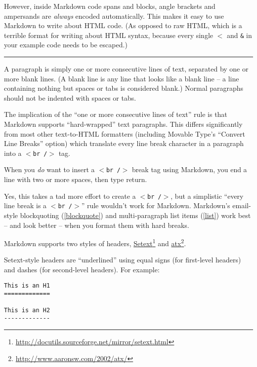 However, inside Markdown code spans and blocks, angle brackets and
ampersands are \emph{always} encoded automatically. This makes it easy to use
Markdown to write about HTML code. (As opposed to raw HTML, which is a
terrible format for writing about HTML syntax, because every single \texttt{$<$}
and \texttt{\&} in your example code needs to be escaped.)

\begin{center}\rule{3in}{0.4pt}\end{center}

A paragraph is simply one or more consecutive lines of text, separated
by one or more blank lines. (A blank line is any line that looks like a
blank line -- a line containing nothing but spaces or tabs is considered
blank.) Normal paragraphs should not be indented with spaces or tabs.

The implication of the ``one or more consecutive lines of text'' rule is
that Markdown supports ``hard-wrapped'' text paragraphs. This differs
significantly from most other text-to-HTML formatters (including Movable
Type's ``Convert Line Breaks'' option) which translate every line break
character in a paragraph into a \texttt{$<$br \slash $>$} tag.

When you \emph{do} want to insert a \texttt{$<$br \slash $>$} break tag using Markdown, you
end a line with two or more spaces, then type return.

Yes, this takes a tad more effort to create a \texttt{$<$br \slash $>$}, but a simplistic
``every line break is a \texttt{$<$br \slash $>$}'' rule wouldn't work for Markdown.
Markdown's email-style blockquoting (\autoref{blockquote}) and multi-paragraph list items (\autoref{list})
work best -- and look better -- when you format them with hard breaks.

Markdown supports two styles of headers, \href{http://docutils.sourceforge.net/mirror/setext.html}{Setext}\footnote{\href{http://docutils.sourceforge.net/mirror/setext.html}{http:\slash \slash docutils.sourceforge.net\slash mirror\slash setext.html}} and \href{http://www.aaronsw.com/2002/atx/}{atx}\footnote{\href{http://www.aaronsw.com/2002/atx/}{http:\slash \slash www.aaronsw.com\slash 2002\slash atx\slash }}.

Setext-style headers are ``underlined'' using equal signs (for first-level
headers) and dashes (for second-level headers). For example:

\begin{verbatim}
This is an H1
=============

This is an H2
-------------
\end{verbatim}

